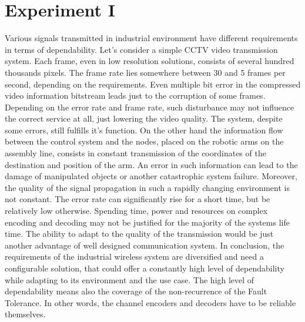 \chapter{Experiment I}

Various signals transmitted in industrial environment have different requirements in terms of dependability. Let's consider a simple CCTV video transmission system. Each frame, even in low resolution solutions, consists of several hundred thousands pixels. The frame rate lies somewhere between 30 and 5 frames per second, depending on the requirements. Even multiple bit error in the compressed video information bitstream leads just to the corruption of some frames. Depending on the error rate and frame rate, such disturbance may not influence the correct service at all, just lowering the video quality. The system, despite some errors, still fulfills it's function. 
On the other hand the information flow between the control system and the nodes, placed on the robotic arms on the assembly line, consists in constant transmission of the coordinates of the destination and position of the arm. An error in such information can lead to the damage of manipulated objects or another catastrophic system failure.
Moreover, the quality of the signal propagation in such a rapidly changing environment is not constant. The error rate can significantly rise for a short time, but be relatively low otherwise. Spending time, power and resources on complex encoding and decoding may not be justified for the majority of the systems life time. The ability to adapt to the quality of the transmission would be just another advantage of well designed communication system.
In conclusion, the requirements of the industrial wireless system are diversified and need a configurable solution, that could offer a constantly high level of dependability while adapting to its environment and the use case. The high level of dependability means also the coverage of the non-recurrence of the Fault Tolerance. In other words, the channel encoders and decoders have to be reliable themselves.


